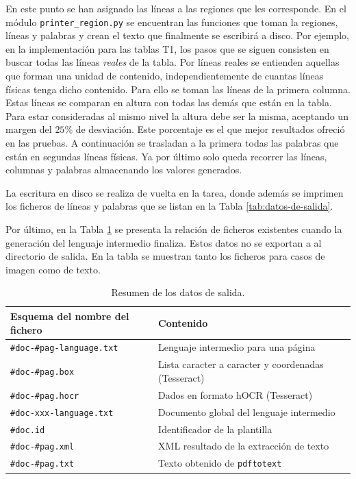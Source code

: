 En este punto se han asignado las líneas a las regiones que les corresponde. En el módulo \verb|printer_region.py| se encuentran las funciones que toman la regiones, líneas y palabras y crean el texto que finalmente se escribirá a disco. Por ejemplo, en la implementación para las tablas T1, los pasos que se siguen consisten en buscar todas las líneas \emph{reales} de la tabla. Por líneas reales se entienden aquellas que forman una unidad de contenido, independientemente de cuantas líneas físicas tenga dicho contenido. Para ello se toman las líneas de la primera columna. Estas líneas se comparan en altura con todas las demás que están en la tabla. Para estar consideradas al mismo nivel la altura debe ser la misma, aceptando un margen del $ 25\% $ de desviación. Este porcentaje es el que mejor resultados ofreció en las pruebas. A continuación se trasladan a la primera todas las palabras que están en segundas líneas físicas. Ya por último solo queda recorrer las líneas, columnas y palabras almacenando los valores generados.

La escritura en disco se realiza de vuelta en la tarea, donde además se imprimen los ficheros de líneas y palabras que se listan en la Tabla \ref{tab:datos-de-salida}.


Por último, en la Tabla \ref{tab:datos-intermedios} se presenta la relación de ficheros existentes cuando la generación del lenguaje intermedio finaliza. Estos datos no se exportan a al directorio de salida. En la tabla se muestran tanto los ficheros para casos de imagen como de texto.

\begin{table}[ht]
    \centering
    \begin{tabular}{l l}
        Esquema del nombre del fichero & Contenido \\
        \hline
        \hline
        \verb|#doc-#pag-language.txt| & Lenguaje intermedio para una página \\
        \verb|#doc-#pag.box| & Lista caracter a caracter y coordenadas (Tesseract) \\
        \verb|#doc-#pag.hocr| & Dados en formato hOCR (Tesseract) \\
        \verb|#doc-xxx-language.txt| & Documento global del lenguaje intermedio \\
        \verb|#doc.id| & Identificador de la plantilla \\
        \verb|#doc-#pag.xml| & XML resultado de la extracción de texto \\
        \verb|#doc-#pag.txt| & Texto obtenido de \verb|pdftotext| \\
    \end{tabular}
    \caption{Resumen de los datos de salida.}    
    \label{tab:datos-intermedios}
\end{table}

